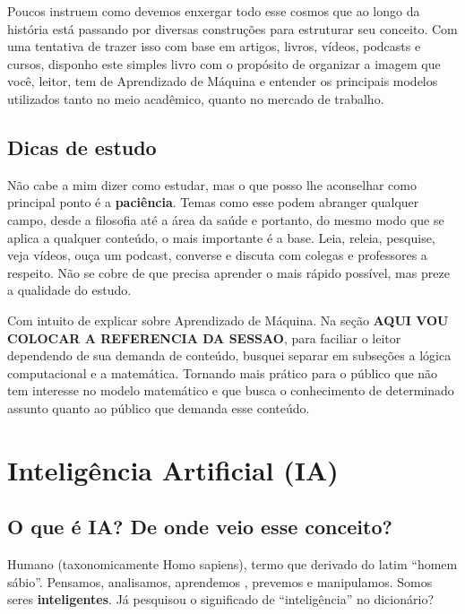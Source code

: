 \documentclass[
]{book}
\begin{document}
Poucos instruem como devemos enxergar todo esse cosmos que ao longo da história está passando por diversas construções para estruturar seu conceito. Com uma tentativa de trazer isso com base em artigos, livros, vídeos, podcasts e cursos, disponho este simples livro com o propósito de organizar a imagem que você, leitor, tem de Aprendizado de Máquina e entender os principais modelos utilizados tanto no meio acadêmico, quanto no mercado de trabalho.

\hypertarget{dicas-de-estudo}{%
\section{Dicas de estudo}\label{dicas-de-estudo}}

Não cabe a mim dizer como estudar, mas o que posso lhe aconselhar como principal ponto é a \textbf{paciência}. Temas como esse podem abranger qualquer campo, desde a filosofia até a área da saúde e portanto, do mesmo modo que se aplica a qualquer conteúdo, o mais importante é a base. Leia, releia, pesquise, veja vídeos, ouça um podcast, converse e discuta com colegas e professores a respeito. Não se cobre de que precisa aprender o mais rápido possível, mas preze a qualidade do estudo.

Com intuito de explicar sobre Aprendizado de Máquina. Na seção \textbf{AQUI VOU COLOCAR A REFERENCIA DA SESSAO}, para faciliar o leitor dependendo de sua demanda de conteúdo, busquei separar em subseções a lógica computacional e a matemática. Tornando mais prático para o público que não tem interesse no modelo matemático e que busca o conhecimento de determinado assunto quanto ao público que demanda esse conteúdo.

\hypertarget{i-a}{%
\chapter{Inteligência Artificial (IA)}\label{i-a}}

\hypertarget{o-que-uxe9-ia-de-onde-veio-esse-conceito}{%
\section{O que é IA? De onde veio esse conceito?}\label{o-que-uxe9-ia-de-onde-veio-esse-conceito}}

Humano (taxonomicamente Homo sapiens), termo que derivado do latim ``homem sábio''. Pensamos, analisamos, aprendemos , prevemos e manipulamos. Somos seres \textbf{inteligentes}. Já pesquisou o significado de ``inteligência'' no dicionário?
\end{document}
